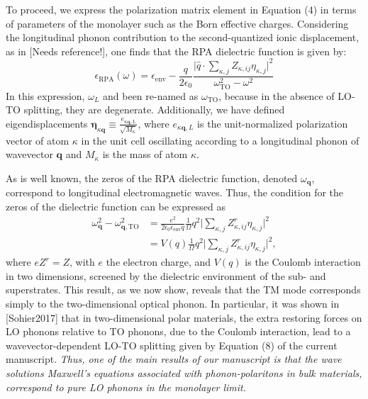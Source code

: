 \documentclass[aps,prb,twocolumn,
	groupedaddress,superscriptaddress,
	amsfonts,amssymb,amsmath,floatfix,
	citeautoscript]{revtex4-1}
\begin{document}
To proceed, we express the polarization matrix element in Equation (4) in terms of parameters of the monolayer such as the Born effective charges. Considering the longitudinal phonon contribution to the second-quantized ionic displacement, as in [Needs reference!], one finds that the RPA dielectric function is given by:
\begin{equation}
\epsilon_{\mathrm{RPA}}(\omega) = \epsilon_{\mathrm{env}} - \frac{q}{2\epsilon_0}\frac{\Big|\hat{q}\cdot\sum\limits_{\kappa,j} Z_{\kappa,ij}\eta_{\kappa,j}  \Big|^2}{\omega^2_{\mathrm{TO}}-\omega^2}
\end{equation}
In this expression, $\omega_L$ and been re-named as $\omega_{\mathrm{TO}}$, because in the absence of LO-TO splitting, they are degenerate. Additionally, we have defined eigendisplacements $\boldsymbol{\eta}_{\kappa\mathbf{q}}\equiv \frac{e_{\kappa\mathbf{q},L}}{\sqrt{M_{\kappa}}}$, where $e_{\kappa\mathbf{q},L}$ is the unit-normalized polarization vector of atom $\kappa$ in the unit cell oscillating according to a longitudinal phonon of wavevector $\mathbf{q}$ and $M_{\kappa}$ is the mass of atom $\kappa$.

As is well known, the zeros of the RPA dielectric function, denoted $\omega_{\mathbf{q}}$, correspond to longitudinal electromagnetic waves. Thus, the condition for the zeros of the dielectric function can be expressed as 
\begin{align}
\omega^2_{\mathbf{q}} - \omega^2_{\mathbf{q},\mathrm{TO}} &= \frac{e^2}{2\epsilon_0\epsilon_{\mathrm{env}}q}\frac{1}{\Omega}q^2\Big|\sum\limits_{\kappa,j}Z^r_{\kappa,ij}\eta_{\kappa,j}  \Big|^2 \nonumber \\
&= V(q)\frac{1}{\Omega}q^2\Big|\sum\limits_{\kappa,j}Z^r_{\kappa,ij}\eta_{\kappa,j}  \Big|^2,
\end{align}
where $eZ^r = Z$, with $e$ the electron charge, and $V(q)$ is the Coulomb interaction in two dimensions, screened by the dielectric environment of the sub- and superstrates. This result, as we now show, reveals that the TM mode corresponds simply to the two-dimensional optical phonon. In particular, it was shown in [Sohier2017] that in two-dimensional polar materials, the extra restoring forces on LO phonons relative to TO phonons, due to the Coulomb interaction, lead to a wavevector-dependent LO-TO splitting given by Equation (8) of the current manuscript. \textit{Thus, one of the main results of our manuscript is that the wave solutions Maxwell's equations associated with phonon-polaritons in bulk materials, correspond to pure LO phonons in the monolayer limit.} 
\end{document}
